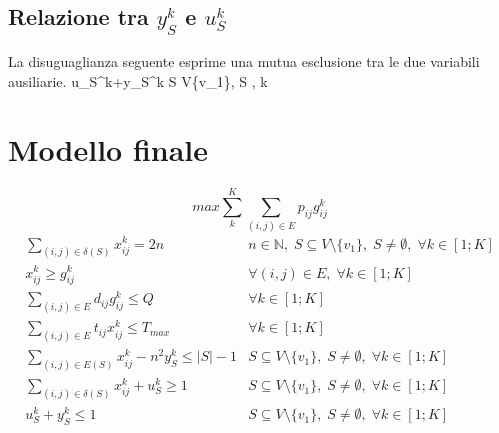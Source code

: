 \subsection{Relazione tra $y_S^k$ e $u_S^k$}
	La disuguaglianza seguente esprime una mutua esclusione tra le due variabili ausiliarie.
	{u_S^k+y_S^k  \;\;\;\;\; S \subseteq V{\setminus}\{v_1\},\; S \neq \emptyset,\; k \in [1;K]}

\section{Modello finale}
{\large
$$max \sum_{k}^{K}{\sum_{(i,j)\in E}{p_{ij}g_{ij}^{k}}}$$
$$
\begin{array}{lr}
	\sum_{(i,j)\in \delta(S)}{x_{ij}^{k}} = 2n & n \in \mathbb{N},\; S \subseteq V{\setminus}\{v_1\},\; S \neq \emptyset,\; \forall k \in [1;K]\\
	x_{ij}^{k} \geq g_{ij}^{k} & \forall(i,j) \in E,\; \forall k \in [1;K]\\
	\sum_{(i,j)\in E}{d_{ij}g_{ij}^{k}} \leq Q & \forall k \in [1;K]\\
	\sum_{(i,j)\in E}{t_{ij}x_{ij}^{k}} \leq T_{max} & \forall k \in [1;K]\\
	\sum_{(i,j)\in E(S)}{x_{ij}^{k}-n^2 y_S^k} \leq |S|-1 & S \subseteq V{\setminus}\{v_1\},\; S \neq \emptyset,\; \forall k \in [1;K] \\
	\sum_{(i,j)\in \delta(S)}{x_{ij}^{k}+u_S^k} \geq 1 & S \subseteq V{\setminus}\{v_1\},\; S \neq \emptyset,\; \forall k \in [1;K] \\
	u_S^k+y_S^k \leq 1 & S \subseteq V{\setminus}\{v_1\},\; S \neq \emptyset,\; \forall k \in [1;K] \\
\end{array}
$$}